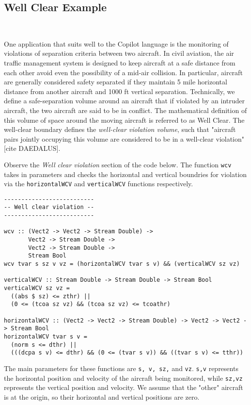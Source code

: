 \subsection{Well Clear Example}~\label{sec:WellClear}


One application that suits well to the Copilot language is the
monitoring of violations of separation criteria between two aircraft.
In civil aviation, the air traffic management  system is designed to  keep
aircraft at a safe distance from each other avoid even the
possibility of a mid-air collision.  In particular,  aircraft are
generally considered safety separated if they maintain 5 mile
horizontal distance from another aircraft and 1000 ft vertical
separation. Technically,  we define  a safe-separation volume around an
aircraft that if violated by an intruder aircraft, the two aircraft
are said to be in conflict. The mathematical definition of this volume
of space around the  moving aircraft  is referred
to as Well Clear. The well-clear boundary defines  the
\emph{well-clear violation volume}, such that "aircraft pairs jointly
occupying this volume are considered to be in a well-clear violation"
[cite DAEDALUS].

Observe the \emph{Well clear violation} section of the code below. The function {\tt wcv} takes in parameters and
checks the horizontal and vertical boundries for violation via the {\tt horizontalWCV} and {\tt verticalWCV} functions respectively. 

\begin{lstlisting}[language = copilot]
--------------------------
-- Well clear violation --
--------------------------

wcv :: (Vect2 -> Vect2 -> Stream Double) ->
       Vect2 -> Stream Double ->
       Vect2 -> Stream Double ->
       Stream Bool
wcv tvar s sz v vz = (horizontalWCV tvar s v) && (verticalWCV sz vz)

verticalWCV :: Stream Double -> Stream Double -> Stream Bool
verticalWCV sz vz =
  ((abs $ sz) <= zthr) ||
  (0 <= (tcoa sz vz) && (tcoa sz vz) <= tcoathr)

horizontalWCV :: (Vect2 -> Vect2 -> Stream Double) -> Vect2 -> Vect2 -> Stream Bool
horizontalWCV tvar s v =
  (norm s <= dthr) ||
  (((dcpa s v) <= dthr) && (0 <= (tvar s v)) && ((tvar s v) <= tthr))
\end{lstlisting}

The main parameters for these functions are {\tt s, v, sz,} and {\tt vz}. {\tt s,v} represents the horizontal position and velocity of the aircraft being monitored, while {\tt sz,vz} represents the vertical position and velocity. We assume that the "other" aircraft is at the origin, so their horizontal and vertical positions are zero. 

